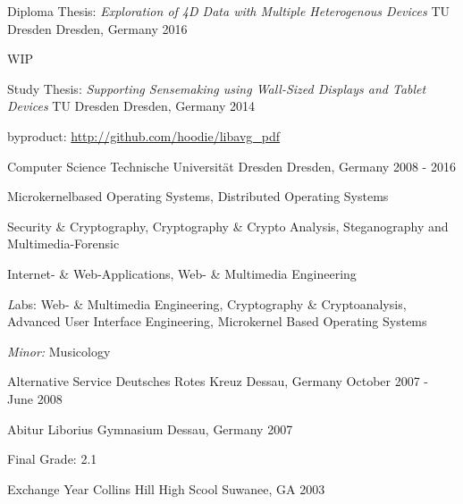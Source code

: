 \begin{cventries}

  \cventry
    {Diploma Thesis: \quad
      \textit{Exploration of 4D Data with Multiple Heterogenous Devices}}
    {TU Dresden}
    {Dresden, Germany}
    {2016}
    {
      \begin{cvitems}
      \item[]{WIP}
      \end{cvitems}
    }

  \cventry
    {Study Thesis:\quad
      \textit{Supporting Sensemaking using Wall-Sized Displays and Tablet Devices}}
    {TU Dresden}
    {Dresden, Germany}
    {2014}
    {
      \begin{cvitems}
      \item[] {byproduct: \url{http://github.com/hoodie/libavg_pdf}}
      \end{cvitems}
    }

  \cventry
    {Computer Science}
    {Technische Universität Dresden}
    {Dresden, Germany}
    {2008 - 2016}
    {
      \begin{cvitems}
      \item {
          Microkernelbased Operating Systems,
          Distributed Operating Systems
        }
      \item {
          Security \& Cryptography,
          Cryptography \& Crypto Analysis,
          Steganography and Multimedia-Forensic
        }
      \item {
          Internet- \& Web-Applications, Web- \& Multimedia Engineering
        }
      \item {
          {\textit Labs:}  Web- \& Multimedia Engineering,
          Cryptography \& Cryptoanalysis,
          Advanced User Interface Engineering,
          Microkernel Based Operating Systems
        }
      \item {\textit{Minor:} Musicology}
      \end{cvitems}
    }

  \cventry
    {Alternative Service}
    {Deutsches Rotes Kreuz}
    {Dessau, Germany}
    {October 2007 - June 2008}
    {
    }

  \cventry
    {Abitur}
    {Liborius Gymnasium}
    {Dessau, Germany}
    {2007}
    {
      \begin{cvitems}
      \item[] {Final Grade: 2.1}
      \end{cvitems}
    }
  \cventry
    {Exchange Year}
    {Collins Hill High Scool}
    {Suwanee, GA}
    {2003}
    {
      \begin{cvitems}
      \end{cvitems}
    }
\end{cventries}
